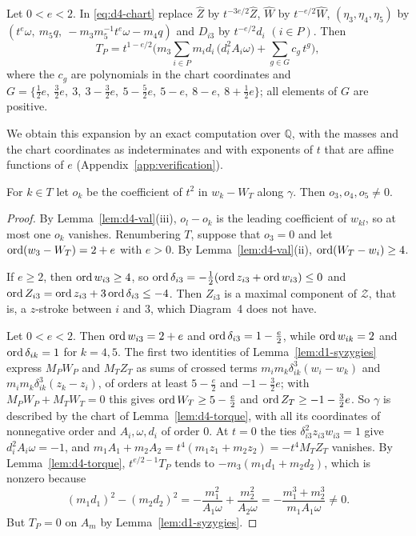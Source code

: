 \begin{lemma}\label{lem:d4-torque}
Let $0<e<2$.  In \eqref{eq:d4-chart} replace $\hat Z$ by $t^{-3e/2}\hat Z$, $\hat W$ by
$t^{-e/2}\hat W$, $(\eta_3,\eta_4,\eta_5)$ by $(t^e\omega,\ m_5q,\ -m_3m_5^{-1}t^e\omega-m_4q)$ and
$D_{i3}$ by $t^{-e/2}d_i$ $(i\in P)$.  Then
\[
  T_P=t^{1-e/2}\Big(m_3\sum_{i\in P}m_id_i\,\big(d_i^2A_i\omega\big)+\sum_{g\in G}c_g\,t^g\Big),
\]
where the $c_g$ are polynomials in the chart coordinates and
$G=\{\tfrac12e,\ \tfrac32e,\ 3,\ 3-\tfrac32e,\ 5-\tfrac52e,\ 5-e,\ 8-e,\ 8+\tfrac12e\}$; all
elements of $G$ are positive.
\end{lemma}
We obtain this expansion by an exact computation over $\mathbb Q$, with the masses and the chart
coordinates as indeterminates and with exponents of $t$ that are affine functions of $e$
(Appendix~\ref{app:verification}).

\begin{lemma}\label{lem:d4-central}
For $k\in T$ let $o_k$ be the coefficient of $t^2$ in $w_k-W_T$ along $\gamma$.  Then
$o_3,o_4,o_5\ne0$.
\end{lemma}

\begin{proof}
By Lemma~\ref{lem:d4-val}(iii), $o_l-o_k$ is the leading coefficient of $w_{kl}$, so at most one
$o_k$ vanishes.  Renumbering $T$, suppose that $o_3=0$ and let $\operatorname{ord}(w_3-W_T)=2+e$ with $e>0$.
By Lemma~\ref{lem:d4-val}(ii), $\operatorname{ord}(W_T-w_i)\ge4$.

If $e\ge2$, then $\operatorname{ord} w_{i3}\ge4$, so $\operatorname{ord}\delta_{i3}=-\frac12(\operatorname{ord} z_{i3}+\operatorname{ord} w_{i3})\le0$ and
$\operatorname{ord} Z_{i3}=\operatorname{ord} z_{i3}+3\operatorname{ord}\delta_{i3}\le-4$.  Then $Z_{i3}$ is a maximal component of
$\mathcal Z$, that is, a $z$-stroke between $i$ and $3$, which Diagram~4 does not have.

Let $0<e<2$.  Then $\operatorname{ord} w_{i3}=2+e$ and $\operatorname{ord}\delta_{i3}=1-\frac e2$, while $\operatorname{ord} w_{ik}=2$ and
$\operatorname{ord}\delta_{ik}=1$ for $k=4,5$.  The first two identities of Lemma~\ref{lem:d1-syzygies} express
$M_PW_P$ and $M_TZ_T$ as sums of crossed terms $m_im_k\delta_{ik}^3(w_i-w_k)$ and
$m_im_k\delta_{ik}^3(z_k-z_i)$, of orders at least $5-\frac e2$ and $-1-\frac32e$; with
$M_PW_P+M_TW_T=0$ this gives $\operatorname{ord} W_T\ge5-\frac e2$ and $\operatorname{ord} Z_T\ge-1-\frac32e$.  So $\gamma$ is
described by the chart of Lemma~\ref{lem:d4-torque}, with all its coordinates of nonnegative
order and $A_i,\omega,d_i$ of order $0$.  At $t=0$ the ties $\delta_{i3}^2z_{i3}w_{i3}=1$ give
$d_i^2A_i\omega=-1$, and $m_1A_1+m_2A_2=t^4(m_1z_1+m_2z_2)=-t^4M_TZ_T$ vanishes.  By
Lemma~\ref{lem:d4-torque}, $t^{e/2-1}T_P$ tends to $-m_3(m_1d_1+m_2d_2)$, which is nonzero because
\[
  (m_1d_1)^2-(m_2d_2)^2=-\frac{m_1^2}{A_1\omega}+\frac{m_2^2}{A_2\omega}
  =-\frac{m_1^3+m_2^3}{m_1A_1\omega}\ne0 .
\]
But $T_P=0$ on $A_m$ by Lemma~\ref{lem:d1-syzygies}.
\end{proof}

